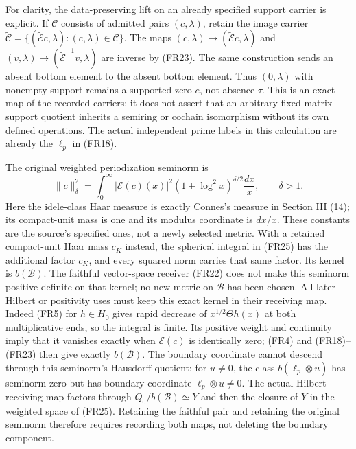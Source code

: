 \documentclass[11pt]{article}
\begin{document}
For clarity, the data-preserving lift on an already specified support carrier is explicit. If $\mathscr C$ consists of admitted pairs $(c,\lambda)$, retain the image carrier
$\widetilde{\mathscr C}=\{(\widetilde{\mathcal E}c,\lambda):(c,\lambda)\in\mathscr C\}$.
The maps $(c,\lambda)\mapsto(\widetilde{\mathcal E}c,\lambda)$ and
$(v,\lambda)\mapsto(\widetilde{\mathcal E}^{-1}v,\lambda)$ are inverse by (FR23). The same construction sends an absent bottom element to the absent bottom element. Thus $(0,\lambda)$ with nonempty support remains a supported zero $e$, not absence $\tau$. This is an exact map of the recorded carriers; it does not assert that an arbitrary fixed matrix-support quotient inherits a semiring or cochain isomorphism without its own defined operations. The actual independent prime labels in this calculation are already the $\ell_p$ in (FR18).

The original weighted periodization seminorm is
\begin{equation}
 \|c\|_\delta^2=\int_0^\infty|\mathcal E(c)(x)|^2
 (1+\log^2x)^{\delta/2}\frac{dx}{x},\qquad\delta>1.
 \tag{FR25}
\end{equation}
Here the idele-class Haar measure is exactly Connes's measure in Section III (14); its compact-unit mass is one and its modulus coordinate is $dx/x$. These constants are the source's specified ones, not a newly selected metric. With a retained compact-unit Haar mass $c_K$ instead, the spherical integral in (FR25) has the additional factor $c_K$, and every squared norm carries that same factor.
Its kernel is $b(\mathcal B)$. The faithful vector-space receiver (FR22) does not make this seminorm positive definite on that kernel; no new metric on $\mathcal B$ has been chosen. All later Hilbert or positivity uses must keep this exact kernel in their receiving map.
Indeed (FR5) for $h\in H_0$ gives rapid decrease of $x^{1/2}\Theta h(x)$ at both multiplicative ends, so the integral is finite. Its positive weight and continuity imply that it vanishes exactly when $\mathcal E(c)$ is identically zero; (FR4) and (FR18)--(FR23) then give exactly $b(\mathcal B)$. The boundary coordinate cannot descend through this seminorm's Hausdorff quotient: for $u\ne0$, the class $b(\ell_p\otimes u)$ has seminorm zero but has boundary coordinate $\ell_p\otimes u\ne0$. The actual Hilbert receiving map factors through $Q_0/b(\mathcal B)\simeq Y$ and then the closure of $Y$ in the weighted space of (FR25). Retaining the faithful pair and retaining the original seminorm therefore requires recording both maps, not deleting the boundary component.
\end{document}
